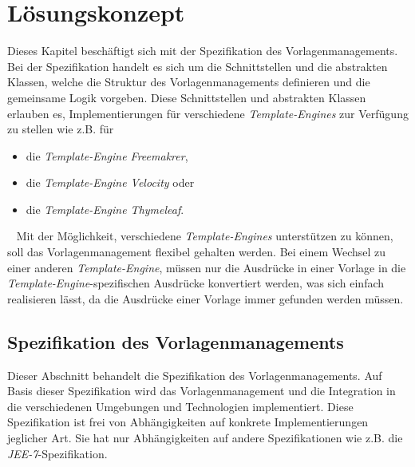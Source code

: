 \chapter{Lösungskonzept}
\label{cha:Lösungskonzept}
Dieses Kapitel beschäftigt sich mit der Spezifikation des Vorlagenmanagements. Bei der Spezifikation handelt es sich um die Schnittstellen und die abstrakten Klassen, welche die Struktur des Vorlagenmanagements definieren und die gemeinsame Logik vorgeben. Diese Schnittstellen und abstrakten Klassen erlauben es, Implementierungen für verschiedene \emph{Template-Engines} zur Verfügung zu stellen wie z.B. für
\begin{itemize}
	\item die \emph{Template-Engine Freemakrer},
	\item die \emph{Template-Engine Velocity} oder
	\item die \emph{Template-Engine Thymeleaf}.
\end{itemize}
\ \newline
Mit der Möglichkeit, verschiedene \emph{Template-Engines} unterstützen zu können, soll das Vorlagenmanagement flexibel gehalten werden. Bei einem Wechsel zu einer anderen \emph{Template-Engine}, müssen nur die Ausdrücke in einer Vorlage in die \emph{Template-Engine}-spezifischen Ausdrücke konvertiert werden, was sich einfach realisieren lässt, da die Ausdrücke einer Vorlage immer gefunden werden müssen.

\section{Spezifikation des Vorlagenmanagements}
\label{sec:specification-template-management}
Dieser Abschnitt behandelt die Spezifikation des Vorlagenmanagements. Auf Basis dieser Spezifikation wird das Vorlagenmanagement und die Integration in die verschiedenen Umgebungen und Technologien implementiert. Diese Spezifikation ist frei von Abhängigkeiten auf konkrete Implementierungen jeglicher Art. Sie hat nur Abhängigkeiten auf andere Spezifikationen wie z.B. die \emph{JEE-7}-Spezifikation.
\newpage


